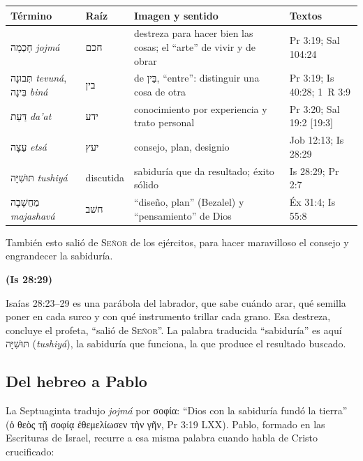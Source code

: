 \documentclass[11pt,letterpaper]{article}
\newcommand{\heb}[1]{\mbox{\foreignlanguage{hebrew}{#1}}}
\newcommand{\grc}[1]{\foreignlanguage{ancientgreek}{#1}}
\newcommand{\SENOR}{\textsc{Señor}}
\newcommand{\fuente}[1]{\par\hfill{\upshape\bfseries\small\textcolor{azul}{#1}}}
\begin{document}
\begin{center}\small\renewcommand{\arraystretch}{1.25}
\begin{tabular}{@{}L{3.0cm}L{1.4cm}L{6.0cm}L{4.0cm}@{}}
\toprule
\textbf{Término} & \textbf{Raíz} & \textbf{Imagen y sentido} & \textbf{Textos} \\ \midrule
\heb{חָכְמָה} \emph{jojmá} & \heb{חכם} & destreza para hacer bien las cosas; el ``arte'' de vivir y de obrar & Pr 3:19; Sal 104:24 \\
\heb{תְּבוּנָה} \emph{tevuná}, \heb{בִּינָה} \emph{biná} & \heb{בין} & de \heb{בֵּין}, ``entre'': distinguir una cosa de otra & Pr 3:19; Is 40:28; 1~R 3:9 \\
\heb{דַּעַת} \emph{da'at} & \heb{ידע} & conocimiento por experiencia y trato personal & Pr 3:20; Sal 19:2 [19:3] \\
\heb{עֵצָה} \emph{etsá} & \heb{יעץ} & consejo, plan, designio & Job 12:13; Is 28:29 \\
\heb{תּוּשִׁיָּה} \emph{tushiyá} & discutida & sabiduría que da resultado; éxito sólido & Is 28:29; Pr 2:7 \\
\heb{מַחֲשָׁבָה} \emph{majashavá} & \heb{חשׁב} & ``diseño, plan'' (Bezalel) y ``pensamiento'' de Dios & Éx 31:4; Is 55:8 \\
\bottomrule
\end{tabular}\end{center}

\begin{cita}También esto salió de \SENOR{} de los ejércitos, para hacer maravilloso el consejo y engrandecer la sabiduría.\fuente{(Is 28:29)}\end{cita}

Isaías 28:23--29 es una parábola del labrador, que sabe cuándo arar, qué semilla poner en cada surco y con qué instrumento trillar cada grano. Esa destreza, concluye el profeta, ``salió de \SENOR''. La palabra traducida ``sabiduría'' es aquí \heb{תּוּשִׁיָּה} (\emph{tushiyá}), la sabiduría que funciona, la que produce el resultado buscado.

\subsection{Del hebreo a Pablo}

La Septuaginta tradujo \emph{jojmá} por \grc{σοφία}: ``Dios con la sabiduría fundó la tierra'' (\grc{ὁ θεὸς τῇ σοφίᾳ ἐθεμελίωσεν τὴν γῆν}, Pr 3:19 LXX). Pablo, formado en las Escrituras de Israel, recurre a esa misma palabra cuando habla de Cristo crucificado:
\end{document}
